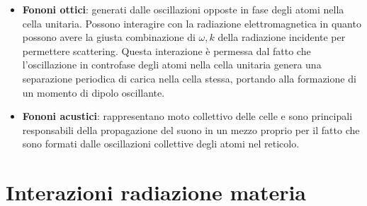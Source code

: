 \documentclass[10pt, a4paper]{scrartcl}
\numberwithin{equation}{subsection}
\theoremstyle{style1}
\theoremstyle{style2}
\begin{document}
\begin{itemize}
	\item \textbf{Fononi ottici}: generati dalle oscillazioni opposte in fase degli atomi nella cella unitaria. Possono interagire con la radiazione elettromagnetica in quanto possono avere la giusta combinazione di $\omega, k$ della radiazione incidente per permettere scattering. Questa interazione \`e permessa dal fatto che l'oscillazione in controfase degli atomi nella cella unitaria genera una separazione periodica di carica nella cella stessa, portando alla formazione di un momento di dipolo oscillante.
	\item \textbf{Fononi acustici}: rappresentano moto collettivo delle celle e sono principali responsabili della propagazione del suono in un mezzo proprio per il fatto che sono formati dalle oscillazioni collettive degli atomi nel reticolo.
\end{itemize}

\newpage

\section{Interazioni radiazione materia}
\end{document}

